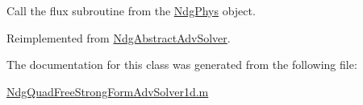 Call the flux subroutine from the \hyperlink{class_ndg_phys}{Ndg\+Phys} object. 



Reimplemented from \hyperlink{class_ndg_abstract_adv_solver_af61d7a5e867f7b8126fd1cc48750c41f}{Ndg\+Abstract\+Adv\+Solver}.



The documentation for this class was generated from the following file\+:\begin{DoxyCompactItemize}
\item 
\hyperlink{_ndg_quad_free_strong_form_adv_solver1d_8m}{Ndg\+Quad\+Free\+Strong\+Form\+Adv\+Solver1d.\+m}\end{DoxyCompactItemize}
